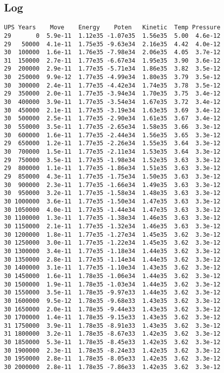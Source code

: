 \documentclass[../main.tex]{subfiles}
\begin{document}
\subsection{Log}
\singlespacing
\begin{verbatim}
UPS Years    Move    Energy    Poten   Kinetic  Temp Pressure
29       0  5.9e-11  1.12e35 -1.07e35  1.56e35  5.00  4.6e-12
29   50000  4.1e-11  1.75e35 -9.63e34  2.16e35  4.42  4.0e-12
30  100000  1.6e-11  1.76e35 -7.98e34  2.06e35  4.05  3.7e-12
31  150000  2.7e-11  1.77e35 -6.67e34  1.95e35  3.90  3.6e-12
29  200000  2.9e-11  1.77e35 -5.71e34  1.86e35  3.82  3.5e-12
30  250000  9.9e-12  1.77e35 -4.99e34  1.80e35  3.79  3.5e-12
30  300000  2.4e-11  1.77e35 -4.42e34  1.74e35  3.78  3.5e-12
29  350000  2.0e-11  1.77e35 -3.94e34  1.70e35  3.75  3.4e-12
30  400000  3.9e-11  1.77e35 -3.54e34  1.67e35  3.72  3.4e-12
30  450000  2.1e-11  1.77e35 -3.19e34  1.63e35  3.69  3.4e-12
30  500000  2.5e-11  1.77e35 -2.90e34  1.61e35  3.67  3.4e-12
30  550000  3.5e-11  1.77e35 -2.65e34  1.58e35  3.66  3.3e-12
30  600000  1.6e-11  1.77e35 -2.44e34  1.56e35  3.65  3.3e-12
29  650000  1.2e-11  1.77e35 -2.26e34  1.55e35  3.64  3.3e-12
30  700000  1.5e-11  1.77e35 -2.11e34  1.53e35  3.64  3.3e-12
29  750000  3.5e-11  1.77e35 -1.98e34  1.52e35  3.63  3.3e-12
29  800000  1.1e-11  1.77e35 -1.86e34  1.51e35  3.63  3.3e-12
29  850000  4.3e-11  1.77e35 -1.75e34  1.50e35  3.63  3.3e-12
30  900000  2.3e-11  1.77e35 -1.66e34  1.49e35  3.63  3.3e-12
30  950000  3.2e-11  1.77e35 -1.58e34  1.48e35  3.63  3.3e-12
30 1000000  3.6e-11  1.77e35 -1.50e34  1.47e35  3.63  3.3e-12
30 1050000  4.0e-11  1.77e35 -1.44e34  1.47e35  3.63  3.3e-12
30 1100000  1.3e-11  1.77e35 -1.38e34  1.46e35  3.63  3.3e-12
30 1150000  2.1e-11  1.77e35 -1.32e34  1.46e35  3.63  3.3e-12
30 1200000  1.8e-11  1.77e35 -1.27e34  1.45e35  3.62  3.3e-12
30 1250000  3.0e-11  1.77e35 -1.22e34  1.45e35  3.62  3.3e-12
30 1300000  3.4e-11  1.77e35 -1.18e34  1.44e35  3.62  3.3e-12
30 1350000  2.8e-11  1.77e35 -1.14e34  1.44e35  3.62  3.3e-12
30 1400000  3.1e-11  1.77e35 -1.10e34  1.43e35  3.62  3.3e-12
30 1450000  1.6e-11  1.78e35 -1.06e34  1.44e35  3.62  3.3e-12
30 1500000  1.9e-11  1.78e35 -1.03e34  1.44e35  3.62  3.3e-12
30 1550000  3.5e-11  1.78e35 -9.97e33  1.44e35  3.62  3.3e-12
30 1600000  9.5e-12  1.78e35 -9.68e33  1.43e35  3.62  3.3e-12
30 1650000  2.0e-11  1.78e35 -9.44e33  1.43e35  3.62  3.3e-12
30 1700000  1.4e-11  1.78e35 -9.15e33  1.43e35  3.62  3.3e-12
31 1750000  3.9e-11  1.78e35 -8.91e33  1.43e35  3.62  3.3e-12
31 1800000  3.2e-11  1.78e35 -8.67e33  1.42e35  3.62  3.3e-12
30 1850000  5.3e-11  1.78e35 -8.45e33  1.42e35  3.62  3.3e-12
30 1900000  2.3e-11  1.78e35 -8.24e33  1.42e35  3.62  3.3e-12
30 1950000  2.8e-11  1.78e35 -8.05e33  1.42e35  3.62  3.3e-12
30 2000000  2.8e-11  1.78e35 -7.86e33  1.42e35  3.62  3.3e-12
\end{verbatim}
\onehalfspacing
\end{document}
